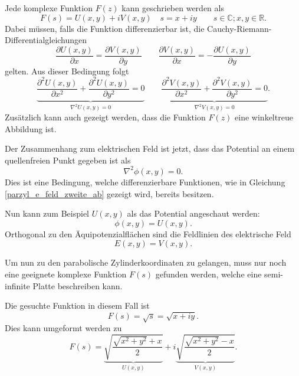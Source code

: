 Jede komplexe Funktion $F(z)$ kann geschrieben werden als
\begin{equation}
	F(s) = U(x,y) + iV(x,y) \quad s = x + iy \qquad s \in \mathbb{C}; x,y \in \mathbb{R}.
\end{equation}  
Dabei müssen, falls die Funktion differenzierbar ist, die
Cauchy-Riemann-Differentialgleichungen 
%
\begin{equation}
	\frac{\partial U(x,y)}{\partial x} 
	=
	\frac{\partial V(x,y)}{\partial y} 
	\qquad
	\frac{\partial V(x,y)}{\partial x}
	=
	-\frac{\partial U(x,y)}{\partial y}
\end{equation}
gelten.
Aus dieser Bedingung folgt 
\begin{equation}
	\label{parzyl_e_feld_zweite_ab}
	\underbrace{
		\frac{\partial^2 U(x,y)}{\partial x^2}
		+ 
		\frac{\partial^2 U(x,y)}{\partial y^2}
		=
		0
	}_{\displaystyle{\nabla^2U(x,y)=0}}
	\qquad
	\underbrace{
		\frac{\partial^2 V(x,y)}{\partial x^2}
		+
		\frac{\partial^2 V(x,y)}{\partial y^2}
		=
		0
	}_{\displaystyle{\nabla^2V(x,y) = 0}}.
\end{equation}
Zusätzlich kann auch gezeigt werden, dass die Funktion $F(z)$ eine winkeltreue Abbildung ist.


Der Zusammenhang zum elektrischen Feld ist jetzt, dass das Potential an einem quellenfreien Punkt gegeben ist als 
\begin{equation}
	\nabla^2\phi(x,y) = 0.
\end{equation}
Dies ist eine Bedingung, welche differenzierbare Funktionen, wie in Gleichung \eqref{parzyl_e_feld_zweite_ab} gezeigt wird, bereits besitzen. 


Nun kann zum Beispiel $U(x,y)$ als das Potential angeschaut werden:
\begin{equation}
	\phi(x,y) = U(x,y).
\end{equation}
Orthogonal zu den Äquipotenzialflächen sind die Feldlinien des elektrische Feld
%
%
\begin{equation}
	E(x,y) = V(x,y).
\end{equation}


Um nun zu den parabolische Zylinderkoordinaten zu gelangen, muss nur noch eine geeignete 
komplexe Funktion $F(s)$ gefunden werden, 
welche eine semi-infinite Platte beschreiben kann.


Die gesuchte Funktion in diesem Fall ist
\begin{equation}
	F(s) 
	= 
	\sqrt{s} 
	= 
	\sqrt{x + iy}.
\end{equation}
Dies kann umgeformt werden zu
\begin{equation}
	F(s) 
	= 
	\underbrace{\sqrt{\frac{\sqrt{x^2+y^2} + x}{2}}}_{\displaystyle{U(x,y)}} 
	+ 
	i\underbrace{\sqrt{\frac{\sqrt{x^2+y^2} - x}{2}}}_{\displaystyle{V(x,y)}}
	.
\end{equation}


